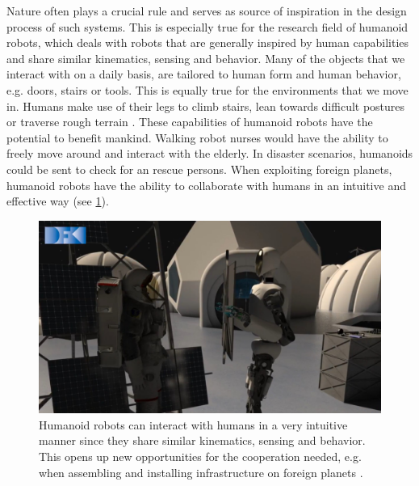 Nature often plays a crucial rule and serves as source of inspiration in the design process of such systems. This is especially true for the research field of humanoid robots, which deals with robots that are generally inspired by human capabilities and share similar kinematics, sensing and behavior. Many of the objects that we interact with on a daily basis, are tailored to human form and human behavior, e.g. doors, stairs or tools. This is equally true for the environments that we move in. Humans make use of their legs to climb stairs, lean towards difficult postures or traverse rough terrain \cite{fitzpatrick2016humanoids}. These capabilities of humanoid robots have the potential to benefit mankind. Walking robot nurses would have the ability to freely move around and interact with the elderly. In disaster scenarios, humanoids could be sent to check for an rescue persons. When exploiting foreign planets, humanoid robots have the ability to collaborate with humans in an intuitive and effective way (see \cref{img:rh5_interactive}).   
\begin{figure}[h!]
\centering	
\includegraphics[width=.7\textwidth]{img/rh5_interactive_16_9.jpg}
\caption{Humanoid robots can interact with humans in a very intuitive manner since they share similar kinematics, sensing and behavior. This opens up new opportunities for the cooperation needed, e.g. when assembling and installing infrastructure on foreign planets \cite{img:rh5_interactive}.}
\label{img:rh5_interactive}
\end{figure} 
    
